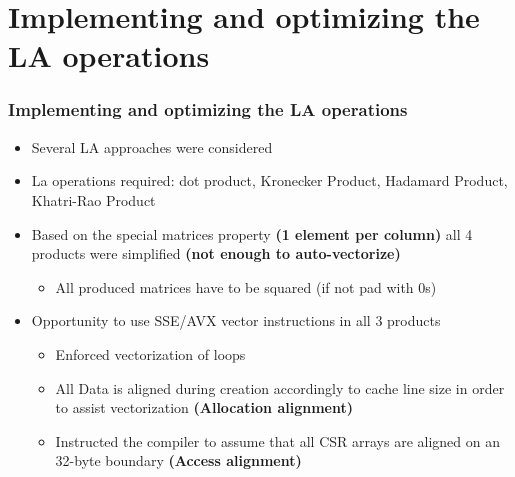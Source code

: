 \documentclass{beamer}
\begin{document}
\section{Implementing and optimizing the LA operations}
\begin{frame}[fragile]
\frametitle{Implementing and optimizing the LA operations}

\begin{itemize}
    \item Several LA approaches were considered
        \vspace{0.3cm}
    \item La operations required: dot product, Kronecker Product, Hadamard Product, Khatri-Rao Product
    \vspace{0.5cm}
    \item Based on the special matrices property \textbf{(1 element per column)} all 4 products were simplified \textbf{(not enough to auto-vectorize)}
    \begin{itemize}
        \item All produced matrices have to be squared (if not pad with 0s)
    \end{itemize}
        \vspace{0.3cm}
        
        \item Opportunity
to use SSE/AVX vector instructions in all 3 products
        \begin{itemize}
            \item Enforced vectorization of loops %
                    \vspace{0.25cm}

             \item All Data is aligned during creation accordingly to cache line size in order to assist vectorization %
             \textbf{(Allocation alignment)}
                                 \vspace{0.25cm}

             
            \item Instructed the compiler to assume that all CSR arrays are aligned on an 32-byte boundary
                         \textbf{(Access alignment)}

           
            


    \end{itemize}
\end{itemize}
\end{frame}
\end{document}

